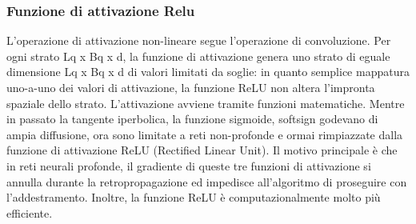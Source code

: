 \documentclass[14pt]{extarticle}
\begin{document}

\subsubsection{Funzione di attivazione Relu}
L’operazione di attivazione non-lineare segue l’operazione di convoluzione. Per ogni
strato Lq x Bq x d, la funzione di attivazione genera uno strato di eguale dimensione
Lq x Bq x d di valori limitati da soglie: in quanto semplice mappatura uno-a-uno dei
valori di attivazione, la funzione ReLU non altera l'impronta spaziale dello strato.
L’attivazione avviene tramite funzioni matematiche. Mentre in passato la tangente iperbolica, la funzione sigmoide, softsign godevano di ampia diffusione, ora sono
limitate a reti non-profonde e ormai rimpiazzate dalla funzione di attivazione ReLU
(Rectified Linear Unit). Il motivo principale è che in reti neurali profonde, il gradiente
di queste tre funzioni di attivazione si annulla durante la retropropagazione ed impedisce all’algoritmo di proseguire con l’addestramento. Inoltre, la funzione ReLU è
computazionalmente molto più efficiente.

\end{document}
